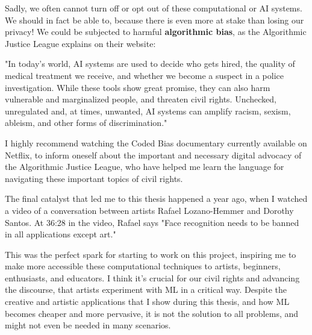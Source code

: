 Sadly, we often cannot turn off or opt out of these computational or \acrshort{AI} systems. We should in fact be able to, because there is even more at stake than losing our privacy! We could be subjected to harmful \textbf{algorithmic bias}, as the Algorithmic Justice League \cite{website-algorithmic-justice-league} explains on their website:

\begin{displayquote}
"In today’s world, AI systems are used to decide who gets hired, the quality of medical treatment we receive, and whether we become a suspect in a police investigation. While these tools show great promise, they can also harm vulnerable and marginalized people, and threaten civil rights. Unchecked, unregulated and, at times, unwanted, AI systems can amplify racism, sexism, ableism, and other forms of discrimination."
\end{displayquote}

I highly recommend watching the Coded Bias documentary \cite{website-coded-bias} currently available on Netflix, to inform oneself about the important and necessary digital advocacy of the Algorithmic Justice League, who have helped me learn the language for navigating these important topics of civil rights.

The final catalyst that led me to this thesis happened a year ago, when I watched a video \cite{website-talk-technology-and-public-art-rafael-lozano-hemmer} of a conversation between artists Rafael Lozano-Hemmer and Dorothy Santos. At 36:28 in the video, Rafael says "Face recognition needs to be banned in all applications except art."

This was the perfect spark for starting to work on this project, inspiring me to make more accessible these computational techniques to artists, beginners, enthusiasts, and educators. I think it's crucial for our civil rights and advancing the discourse, that artists experiment with \acrshort{ML} in a critical way. Despite the creative and artistic applications that I show during this thesis, and how \acrshort{ML} becomes cheaper and more pervasive, it is not the solution to all problems, and might not even be needed in many scenarios.

